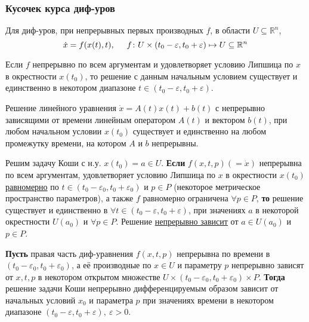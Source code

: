 \subsubsection*{Кусочек курса диф-уров}


Для диф-уров, при непрерывных первых производных $f$, в области $U \subseteq \mathbb{R}^n$, 
\begin{equation*}
    \dot{x} = f(x(t), t), \hspace{0.5cm}  
    f \colon U \times (t_0 - \varepsilon, t_0 + \varepsilon) \mapsto U \subseteq \mathbb{R}^n
\end{equation*}
\begin{to_thr}
     Если $f$ непрерывно по всем аргументам и удовлетворяет условию Липшица по $x$ в окрестности $x(t_0)$, то решение с данным начальным условием существует и единственно в некотором диапазоне $t \in (t_0 - \varepsilon, t_0 + \varepsilon)$.
\end{to_thr}


\begin{to_thr}
     Решение линейного уравнения $\dot{x} = A(t) x(t) + b(t)$ с непрерывно зависящими от времени линейным оператором $A(t)$ и вектором $b(t)$, при любом начальном условии $x(t_0)$ существует и единственно на любом промежутку времени, на котором $A$ и $b$ непрерывны.
\end{to_thr}


\begin{to_thr} 
    Решим задачу Коши с н.у. $x(t_0)=a \in U$.
    \textbf{Если} $f(x, t, p) (= \dot{x})$ непрерывна по всем аргументам, удовлетворяет условию Липшица по $x$ в окрестности $x(t_0)$ 
    \underline{равномерно} по $t \in (t_0 - \varepsilon_0, t_0 + \varepsilon_0)$ и $p \in P$ (некоторое метрическое пространство параметров), а также $f$ равномерно ограничена $\forall p \in P$, \textbf{то} решение существует и единственно в $\forall t \in (t_0 - \varepsilon, t_0 + \varepsilon)$, при значениях $a$ в некоторой окрестности $U(a_0)$ и $\forall p \in P$. Решение \underline{непрерывно зависит} от $a \in U(a_0)$ и $p \in P$.
\end{to_thr}


\begin{to_thr}
     \textbf{Пусть} правая часть диф-уравнения $f(x, t, p)$ непрерывна по времени в $(t_0 - \varepsilon_0, t_0 + \varepsilon_0)$, а её производные по $x \in U$ и параметру $p$ непрерывно зависят от $x, t, p$ в некотором открытом множестве $U \times (t_0 - \varepsilon_0, t_0 + \varepsilon_0) \times P$.
     \textbf{Тогда} решение задачи Коши непрерывно дифференцируемым образом зависит от начальных условий $x_0$ и параметра $p$ при значениях времени в некотором диапазоне $(t_0 - \varepsilon, t_0 + \varepsilon), \ \varepsilon > 0$.
\end{to_thr}


